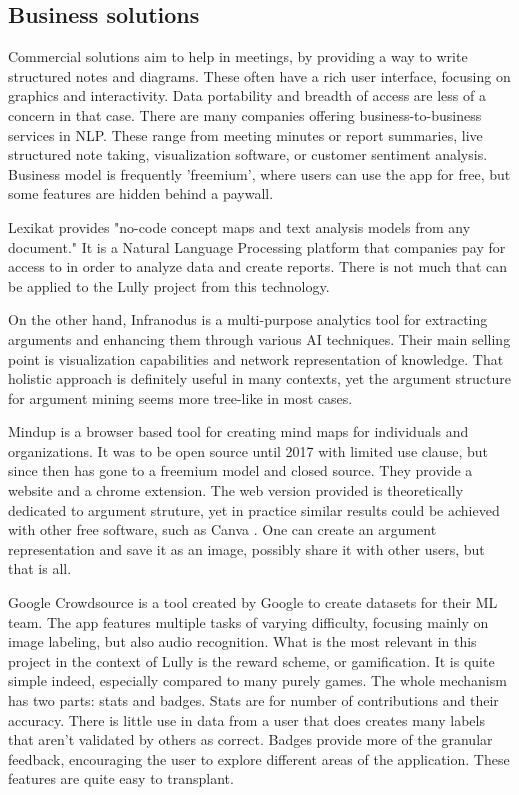 \documentclass{report}
\begin{document}
{\subsection{Business solutions}
Commercial solutions aim to help in meetings, by providing a way to write structured notes and diagrams. These often have a rich user interface, focusing on graphics and interactivity.
Data portability and breadth of access are less of a concern in that case.
There are many companies offering business-to-business services in NLP.  These range from meeting minutes or report summaries, live structured note taking, visualization software, or customer sentiment analysis.  Business model is frequently 'freemium', where users can use the app for free, but some features are hidden behind a paywall.

Lexikat \cite{noauthor_lexikat_nodate} provides "no-code concept maps and text analysis models from any document." It is a Natural Language Processing platform that companies pay for access to in order to analyze data and create reports. There is not much that can be applied to the Lully project from this technology.

On the other hand, Infranodus \cite{noauthor_infranodus_nodate} is a multi-purpose analytics tool for extracting arguments and enhancing them through various AI techniques. Their main selling point is visualization capabilities and network representation of knowledge. That holistic approach is definitely useful in many contexts, yet the argument structure for argument mining seems more tree-like in most cases.

Mindup \cite{noauthor_mindmup_nodate} is a browser based tool for creating mind maps for individuals and organizations. It was to be open source until 2017 with limited use clause, but since then has gone to a freemium model and closed source. They provide a website and a chrome extension. The web version provided is theoretically dedicated to argument struture, yet in practice similar results could be achieved with other free software, such as Canva \cite{noauthor_home_nodate}. One can create an argument representation and save it as an image, possibly share it with other users, but that is all.

Google Crowdsource \cite{noauthor_crowdsource_2023} is a tool created by Google to create datasets for their ML team. The app features multiple tasks of varying difficulty, focusing mainly on image labeling, but also audio recognition. What is the most relevant in this project in the context of Lully is the reward scheme, or gamification. It is quite simple indeed, especially compared to many purely games. The whole mechanism has two parts: stats and badges. Stats are for number of contributions and their accuracy. There is little use in data from a user that does creates many labels that aren't validated by others as correct. Badges provide more of the granular feedback, encouraging the user to explore different areas of the application. These features are quite easy to transplant.

}
\end{document}
